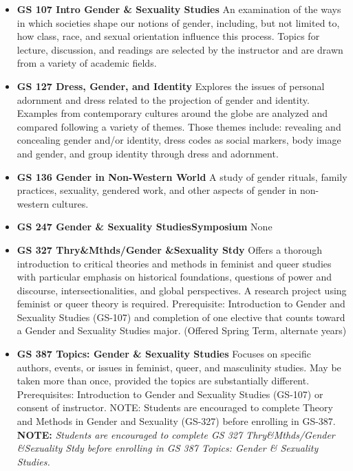 \documentclass[
  letterpaper,
]{scrbook}
\providecommand{\tightlist}{%
  \setlength{\itemsep}{0pt}\setlength{\parskip}{0pt}}
\begin{document}
\begin{itemize}
\tightlist
\item
  \textbf{GS 107 Intro Gender \& Sexuality Studies} An examination of
  the ways in which societies shape our notions of gender, including,
  but not limited to, how class, race, and sexual orientation influence
  this process. Topics for lecture, discussion, and readings are
  selected by the instructor and are drawn from a variety of academic
  fields.
\item
  \textbf{GS 127 Dress, Gender, and Identity} Explores the issues of
  personal adornment and dress related to the projection of gender and
  identity. Examples from contemporary cultures around the globe are
  analyzed and compared following a variety of themes. Those themes
  include: revealing and concealing gender and/or identity, dress codes
  as social markers, body image and gender, and group identity through
  dress and adornment.
\item
  \textbf{GS 136 Gender in Non-Western World} A study of gender rituals,
  family practices, sexuality, gendered work, and other aspects of
  gender in non-western cultures.
\item
  \textbf{GS 247 Gender \& Sexuality StudiesSymposium} None
\item
  \textbf{GS 327 Thry\&Mthds/Gender \&Sexuality Stdy} Offers a thorough
  introduction to critical theories and methods in feminist and queer
  studies with particular emphasis on historical foundations, questions
  of power and discourse, intersectionalities, and global perspectives.
  A research project using feminist or queer theory is required.
  Prerequisite: Introduction to Gender and Sexuality Studies (GS-107)
  and completion of one elective that counts toward a Gender and
  Sexuality Studies major. (Offered Spring Term, alternate years)
\item
  \textbf{GS 387 Topics: Gender \& Sexuality Studies} Focuses on
  specific authors, events, or issues in feminist, queer, and
  masculinity studies. May be taken more than once, provided the topics
  are substantially different. Prerequisites: Introduction to Gender and
  Sexuality Studies (GS-107) or consent of instructor. NOTE: Students
  are encouraged to complete Theory and Methods in Gender and Sexuality
  (GS-327) before enrolling in GS-387. \textbf{NOTE:} \emph{Students are
  encouraged to complete GS 327 Thry\&Mthds/Gender \&Sexuality Stdy
  before enrolling in GS 387 Topics: Gender \& Sexuality Studies. }
\end{itemize}
\end{document}
